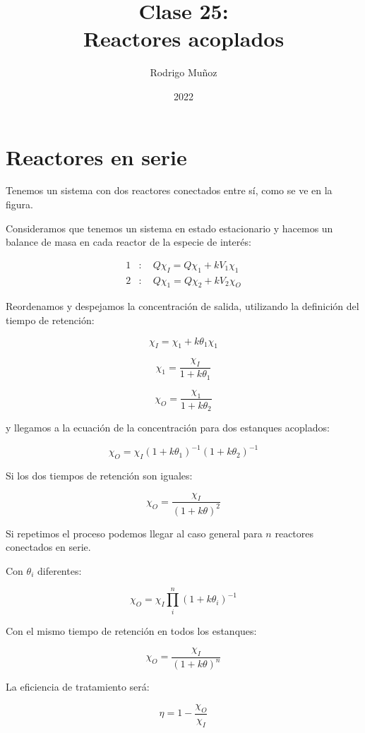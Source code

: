 \documentclass[11pt]{article}
\title{Clase 25: \\ Reactores acoplados}
\author{Rodrigo Muñoz}
\date{2022}
\begin{document}
\maketitle

\section{Reactores en serie}

Tenemos un sistema con dos reactores conectados entre sí, como se ve en la figura.

Consideramos que tenemos un sistema en estado estacionario y hacemos un balance de masa en cada reactor de la especie de interés:

\[ \begin{aligned}
    1 & : \quad Q \chi_I = Q \chi_1 + k V_1 \chi_1 \\
    2 & : \quad Q \chi_1 = Q \chi_2 + k V_2 \chi_O 
\end{aligned} \]

Reordenamos y despejamos la concentración de salida, utilizando la definición del tiempo de retención:

\[ \chi_I = \chi_1 + k \theta_1 \chi_1 \]

\[ \chi_1 = \frac{ \chi_I }{ 1 + k \theta_1 } \]

\[ \chi_O = \frac{ \chi_1 }{ 1 + k \theta_2 } \]

y llegamos a la ecuación de la concentración para dos estanques acoplados:

\[ \boxed{ \chi_O = \chi_I \left( 1 + k \theta_1 \right) ^ {-1} \left( 1 + k \theta_2 \right) ^ {-1} } \]

Si los dos tiempos de retención son iguales:

\[ \boxed{ \chi_O = \frac{ \chi_I }{ \left( 1 + k \theta \right) ^ 2 } } \]

Si repetimos el proceso podemos llegar al caso general para \( n \) reactores conectados en serie.

Con \( \theta_i \) diferentes:

\[ \boxed{ \chi_O = \chi_I \displaystyle\prod_{i}^{n} \left( 1 + k \theta_i \right) ^ {-1} } \]

Con el mismo tiempo de retención en todos los estanques:

\[ \boxed{ \chi_O = \frac{ \chi_I }{ \left( 1 + k \theta \right) ^ n } } \]

La eficiencia de tratamiento será:

\[ \eta = 1 - \frac{ \chi_O }{ \chi_I } \]
\end{document}
